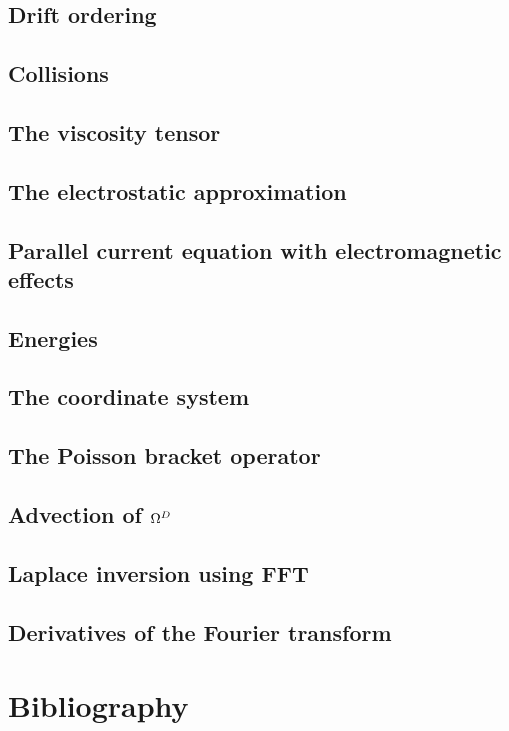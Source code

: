 \documentclass[12pt,a4paper,oneside,openright]{report} %
\begin{document}
\chapter{Drift ordering}
\label{app:DO}


\chapter{Collisions}
\label{app:collisions}


\chapter{The viscosity tensor}
\label{app:piTensor}


\chapter{The electrostatic approximation}
\label{app:elstat}


\chapter{Parallel current equation with electromagnetic effects}
\label{app:elMag}


\chapter{Energies}
\label{app:energies}


\chapter{The coordinate system}
\label{app:coord}


\chapter{The Poisson bracket operator}
\label{app:poisson}


\chapter{Advection of \texorpdfstring{$\Omega^D$}{OmegaD}}
\label{app:vortDAdv}


\chapter{Laplace inversion using FFT}
\label{app:lapInv}


\chapter{Derivatives of the Fourier transform}
\label{app:deriv_of_FT}


\part{Bibliography}


\end{document}
